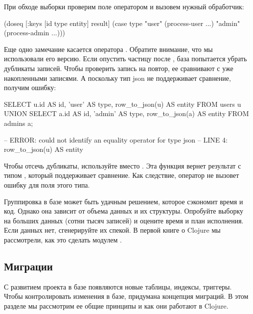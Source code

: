 При обходе выборки проверим поле  оператором  и вызовем нужный обработчик:

\begin{english}
  \begin{clojure}
(doseq [{:keys [id type entity]} result]
  (case type
    "user" (process-user ...)
    "admin" (process-admin ...)))
  \end{clojure}
\end{english}

Еще одно замечание касается оператора . Обратите внимание, что мы использовали его  версию. Если опустить частицу  после , база попытается убрать дубликаты записей. Чтобы проверить запись на повтор, ее сравнивают с уже накопленными записями. А поскольку тип json не поддерживает сравнение, получим ошибку:

\begin{english}
  \begin{sql}
SELECT
  u.id AS id,
  'user' AS type,
  row_to_json(u) AS entity
FROM
  users u
UNION
SELECT
  a.id AS id,
  'admin' AS type,
  row_to_json(a) AS entity
FROM
  admins a;

-- ERROR:  could not identify an equality operator for type json
-- LINE 4:   row_to_json(u) AS entity
  \end{sql}
\end{english}

Чтобы отсечь дубликаты, используйте  вместо . Эта функция вернет результат с типом , который поддерживает сравнение. Как следствие, оператор  не вызовет ошибку для поля этого типа.

Группировка в базе может быть удачным решением, которое сэкономит время и код. Однако она зависит от объема данных и их структуры. Опробуйте выборку на больших данных (сотни тысяч записей) и оцените время и план исполнения. Если данных нет, сгенерируйте их спекой. В первой книге о Clojure мы рассмотрели, как это сделать модулем .

\subsection{Миграции}

С развитием проекта в базе появляются новые таблицы, индексы, триггеры. Чтобы контролировать изменения в базе, придумана концепция миграций. В этом разделе мы рассмотрим ее общие принципы и как они работают в Clojure.

